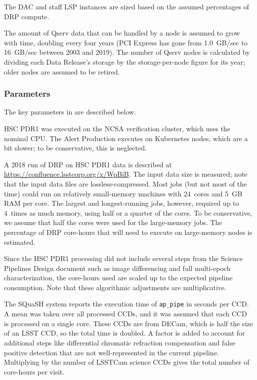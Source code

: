 The DAC and staff LSP instances are sized based on the assumed percentages of DRP compute.

The amount of Qserv data that can be handled by a node is assumed to grow with time, doubling every four years (PCI Express has gone from 1.0~GB/sec to 16~GB/sec between 2003 and 2019).
The number of Qserv nodes is calculated by dividing each Data Release's storage by the storage-per-node figure for its year; older nodes are assumed to be retired.

\subsubsection{Parameters}
The key parameters in  are described below.

HSC PDR1 was executed on the NCSA verification cluster, which uses the nominal CPU.
The Alert Production executes on Kubernetes nodes, which are a bit slower; to be conservative, this is neglected.

A 2018  run of DRP on HSC PDR1 data is described at \url{https://confluence.lsstcorp.org/x/WpBiB}.
The input data size is measured; note that the input data files are lossless-compressed.
Most jobs (but not most of the time) could run on relatively small-memory machines with 24~cores and 5~GB RAM per core.
The largest and longest-running jobs, however, required up to 4~times as much memory, using half or a quarter of the cores.
To be conservative, we assume that half the cores were used for the large-memory jobs.
The percentage of DRP core-hours that will need to execute on large-memory nodes is estimated.

Since the HSC PDR1 processing did not include several steps from the Science Pipelines Design document  such as image differencing and full multi-epoch characterization, the core-hours used are scaled up to the expected pipeline consumption.
Note that these algorithmic adjustments are multiplicative.

The SQuaSH system reports the execution time of \texttt{ap\_pipe} in seconds per CCD.
A mean was taken over all processed CCDs, and it was assumed that each CCD is processed on a single core.
These CCDs are from DECam, which is half the size of an LSST CCD, so the total time is doubled.
A factor is added to account for additional steps like differential chromatic refraction compensation and false positive detection that are not well-represented in the current pipeline.
Multiplying by the number of LSSTCam science CCDs gives the total number of core-hours per visit.

